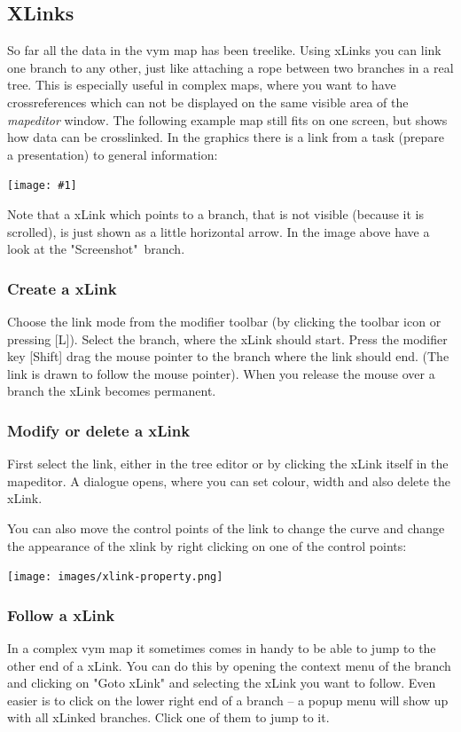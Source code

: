 \documentclass[12pt,a4paper]{article}
\newcommand{\maximage}[1]{  
    \begin{center}
        \texttt{[image: \#1]} 
    \end{center}
}
\newcommand{\vym}{{\sc vym }}
\newcommand{\key}[1]{[#1]}
\begin{document}
\subsection{XLinks} \label{xlinks}
So far all the data in the \vym map has been treelike. Using xLinks you
can link one branch to any other, just like attaching a rope between two
branches in a real tree. This is especially useful in complex maps,
where you want to have crossreferences which can not be displayed on the
same visible area of the {\em mapeditor} window. The following example
map still fits on one screen, but shows how data can be crosslinked. In
the graphics there is a link from a task (prepare a presentation) to
general information: 
\maximage{images/xlink-control.png}
Note that a xLink which points to a branch, that is not visible (because
it is scrolled), is just shown as a little horizontal arrow. In the
image above have a look at the "Screenshot"\ branch.

\subsubsection*{Create a xLink}
Choose the link mode from the modifier toolbar (by clicking the toolbar
icon or pressing \key{L}). Select the branch, where the xLink should
start. Press the modifier key \key{Shift} 
drag the mouse pointer to the branch where the link should end. (The
link is drawn to follow the mouse pointer). When you release the mouse
over a branch the xLink becomes permanent.

\subsubsection*{Modify or delete a xLink}
First select the link, either in the tree editor or by clicking the xLink
itself in the mapeditor.  A dialogue opens, where you can set colour,
width and also delete the xLink.

You can also move the control points of the link to change the curve and
change the appearance of the xlink by right clicking on one of
the control points:
\begin{center}
\texttt{[image: images/xlink-property.png]}
\end{center}


\subsubsection*{Follow a xLink}
In a complex \vym map it sometimes comes in handy to be able to jump to
the other end of a xLink. You can do this by opening the context menu of
the branch and clicking on "Goto xLink" and selecting the xLink you
want to follow. Even easier is to click on the lower right end of a
branch -- a popup menu will show up with all xLinked branches. Click one
of them to jump to it.
\end{document}
